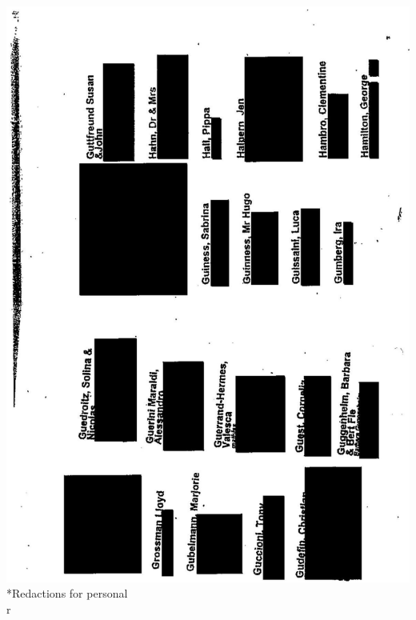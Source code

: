 \documentclass[10pt]{article}
\begin{document}
\includegraphics[max width=\textwidth, center]{2025_02_27_dd68c3d38de88f0516d9g-146}\\
*Redactions for personal\\
r\\
\end{document}
